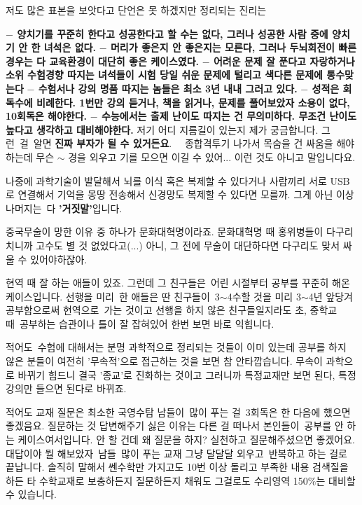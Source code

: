 저도 많은 표본을 보앗다고 단언은 못 하겠지만 정리되는 진리는
\vspace{5mm}

\textbf{$-$ 양치기를 꾸준히 한다고 성공한다고 할 수는 없다, 그러나 성공한 사람 중에 양치기 안 한 녀석은 없다.}
\textbf{$-$ 머리가 좋은지 안 좋은지는 모른다, 그러나 두뇌회전이 빠른 경우는 다 교육환경이 대단히 좋은 케이스였다.}
\textbf{$-$ 어려운 문제 잘 푼다고 자랑하거나 소위 수험경향 따지는 녀석들이 시험 당일 쉬운 문제에 털리고 색다른 문제에 통수맞는다}
\textbf{$-$ 수험서나 강의 명품 따지는 놈들은 최소 3년 내내 그러고 있다.}
\textbf{$-$ 성적은 회독수에 비례한다. 1번만 강의 듣거나, 책을 읽거나, 문제를 풀어보았자 소용이 없다, 10회독은 해야한다.}
\textbf{$-$ 수능에서는 출제 난이도 따지는 건 무의미하다. 무조건 난이도 높다고 생각하고 대비해야한다.}
저기 어디 지름길이 있는지 제가 궁금합니다. 그런 걸 알면 \textbf{진짜 부자가 될 수 있거든요}.   종합격투기 나가서 목숨을 건 싸움을 해야하는데 무슨 $\sim$ 경을 외우고 기를 모으면 이길 수 있어...
이런 것도 아니고 말입니다요.
\vspace{5mm}

나중에 과학기술이 발달해서 뇌를 이식 혹은 복제할 수 있다거나
사람끼리 서로 USB로 연결해서 기억을 몽땅 전송해서 신경망도 복제할 수 있다면 모를까.
그게 아닌 이상 나머지는 다 \textbf{'거짓말'}입니다.
\vspace{5mm}

중국무술이 망한 이유 중 하나가 문화대혁명이라죠.
문화대혁명 때 홍위병들이 다구리치니까 고수도 별 것 없었다고(...)
아니, 그 전에 무술이 대단하다면 다구리도 맞서 싸울 수 있어야하잖아.
\vspace{5mm}

현역 때 잘 하는 애들이 있죠. 그런데 그 친구들은 어린 시절부터 공부를 꾸준히 해온 케이스입니다.
선행을 미리 한 애들은 딴 친구들이 3$\sim$4수할 것을 미리 3$\sim$4년 앞당겨 공부함으로써 현역으로 가는 것이고
선행을 하지 않은 친구들일지라도 초, 중학교 때 공부하는 습관이나 틀이 잘 잡혀있어 한번 보면 바로 익힙니다.
\vspace{5mm}

적어도 수험에 대해서는 분명 과학적으로 정리되는 것들이 이미 있는데
공부를 하지 않은 분들이 여전히 '무속적'으로 접근하는 것을 보면 참 안타깝습니다.
무속이 과학으로 바뀌기 힘드니 결국 '종교'로 진화하는 것이고 그러니까 특정교재만 보면 된다, 특정강의만 들으면 된다로 바뀌죠.
\vspace{5mm}

적어도 교재 질문은 최소한 국영수탐 남들이 많이 푸는 걸 3회독은 한 다음에 했으면 좋겠음요.
질문하는 것 답변해주기 싫은 이유는 다른 걸 떠나서 본인들이 공부를 안 하는 케이스여서입니다. 안 할 건데 왜 질문을 하지?
실천하고 질문해주셨으면 좋겠어요.
대답이야 뭘 해보았자 남들 많이 푸는 교재 그냥 달달달 외우고 반복하고 하는 걸로 끝납니다.
솔직히 말해서 쎈수학만 가지고도 10번 이상 돌리고 부족한 내용 검색질을 하든 타 수학교재로 보충하든지 질문하든지 채워도
그걸로도 수리영역 150$\%$는 대비할 수 있습니다.
\vspace{5mm}

